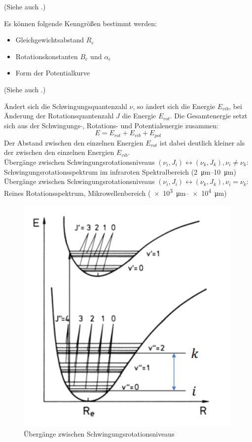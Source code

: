 (Siehe auch .)

Es können folgende Kenngrößen bestimmt werden:
\begin{itemize}
    \item Gleichgewichtsabstand $R_e$
    \item Rotationskonstanten $B_e$ und $\alpha_e$
    \item Form der Potentialkurve
\end{itemize}

\label{q:14}

(Siehe auch .)

Ändert sich die Schwingungsquantenzahl $\nu$, so ändert sich die Energie $E_{vib}$, bei Änderung der Rotationsquantenzahl $J$ die Energie $E_{rot}$. Die Gesamtenergie setzt sich aus der Schwingungs-, Rotations- und Potentialenergie zusammen:
\begin{equation}
    E = E_{rot} + E_{vib} + E_{pot}
\end{equation}
Der Abstand zwischen den einzelnen Energien $E_{rot}$ ist dabei deutlich kleiner als der zwischen den einzelnen Energien $E_{vib}$.\\
Übergänge zwischen Schwingungsrotationsniveaus $(\nu_i, J_i) \longleftrightarrow (\nu_k, J_k), \nu_i \neq \nu_k$: Schwingungsrotationsspektrum im infraroten Spektralbereich (\SIrange{2}{10}{\micro\meter})\\
Übergänge zwischen Schwingungsrotationsniveaus $(\nu_i, J_i) \longleftrightarrow (\nu_k, J_k), \nu_i = \nu_k$: Reines Rotationsspektrum, Mikrowellenbereich (\SIrange{e3}{e4}{\micro\meter})
\begin{figure}[H]
    \centering
    \includegraphics{resources/05-05-2015/Frage_14.png}
\caption{Übergänge zwischen Schwingungsrotationsniveaus}
    \label{fig:enter-label2}
\end{figure}

